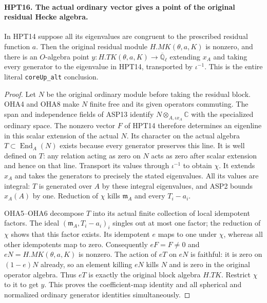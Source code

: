 \documentclass[11pt,a4paper]{article}
\numberwithin{equation}{section}
\theoremstyle{remark}\newtheorem{remark}[theorem]{Remark}
\begin{document}
\paragraph{HPT16. The actual ordinary vector gives a point of the original residual Hecke algebra.}
\label{claim:HPT16}
In HPT14 suppose all its eigenvalues are congruent to the prescribed
residual function $a$.  Then the original residual module
$H.MK(\theta,a,K)$ is nonzero, and there is an $O$-algebra point
$y:H.TK(\theta,a,K)\to\overline{\mathbb Q}_\ell$ extending $x_A$
and taking every generator to the eigenvalue in HPT14, transported
by $\iota^{-1}$.  This is the entire literal
\texttt{core\allowbreak Up\_\allowbreak alt} conclusion.
\begin{proof}
Let $N$ be the original ordinary module before taking the residual
block.  OHA4 and OHA8 make $N$ finite free and its given operators
commuting.  The span and independence fields of ASP13 identify
$N\otimes_{A,\iota x_A}\mathbb C$ with the specialized ordinary
space.  The nonzero vector $F$ of HPT14 therefore determines an
eigenline in this scalar extension of the actual $N$.
Its character on the actual algebra $T\subset\operatorname{End}_A(N)$
exists because every generator preserves this line.  It is
well defined on $T$: any relation acting as zero on $N$ acts
as zero after scalar extension and hence on that line.
Transport its values through $\iota^{-1}$ to obtain $\chi$.
It extends $x_A$ and takes the generators to precisely the stated
eigenvalues.  All its values are integral: $T$ is generated over
$A$ by these integral eigenvalues, and ASP2 bounds $x_A(A)$ by one.
Reduction of $\chi$ kills $\mathfrak m_A$ and every $T_i-a_i$.

OHA5--OHA6 decompose $T$ into its actual finite collection of
local idempotent factors.  The ideal
$(\mathfrak m_A,T_i-a_i)_i$ singles out at most one factor; the
reduction of $\chi$ shows that this factor exists.  Its idempotent
$e$ maps to one under $\chi$, whereas all other idempotents map
to zero.  Consequently $eF=F\ne0$ and $eN=H.MK(\theta,a,K)$
is nonzero.  The action of $eT$ on $eN$ is faithful: it is zero
on $(1-e)N$ already, so an element killing $eN$ kills $N$ and
is zero in the original operator algebra.  Thus $eT$ is exactly
the original block algebra $H.TK$.  Restrict $\chi$ to it to get
$y$.  This proves the coefficient-map identity and all spherical
and normalized ordinary generator identities simultaneously.
\end{proof}
\end{document}
